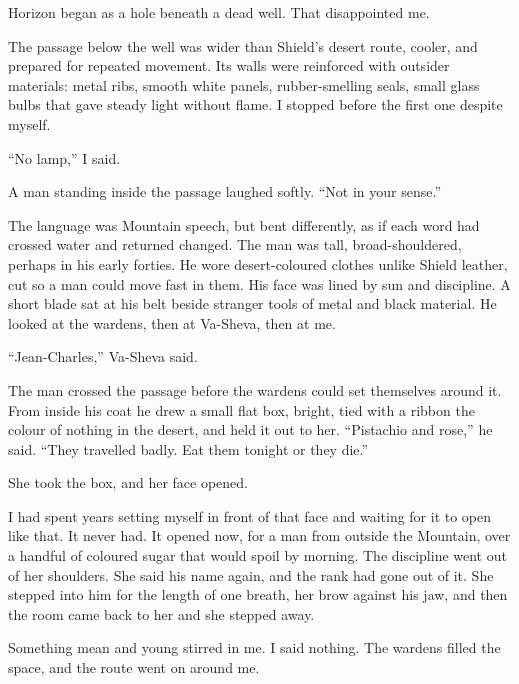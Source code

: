 Horizon began as a hole beneath a dead well. That disappointed me.\par

The passage below the well was wider than Shield's desert route, cooler, and prepared for repeated movement. Its walls were reinforced with outsider materials: metal ribs, smooth white panels, rubber-smelling seals, small glass bulbs that gave steady light without flame. I stopped before the first one despite myself.\par

``No lamp,'' I said.\par

A man standing inside the passage laughed softly. ``Not in your sense.''\par

The language was Mountain speech, but bent differently, as if each word had crossed water and returned changed. The man was tall, broad-shouldered, perhaps in his early forties. He wore desert-coloured clothes unlike Shield leather, cut so a man could move fast in them. His face was lined by sun and discipline. A short blade sat at his belt beside stranger tools of metal and black material. He looked at the wardens, then at Va-Sheva, then at me.\par

``Jean-Charles,'' Va-Sheva said.\par

The man crossed the passage before the wardens could set themselves around it. From inside his coat he drew a small flat box, bright, tied with a ribbon the colour of nothing in the desert, and held it out to her. ``Pistachio and rose,'' he said. ``They travelled badly. Eat them tonight or they die.''\par

She took the box, and her face opened.\par

I had spent years setting myself in front of that face and waiting for it to open like that. It never had. It opened now, for a man from outside the Mountain, over a handful of coloured sugar that would spoil by morning. The discipline went out of her shoulders. She said his name again, and the rank had gone out of it. She stepped into him for the length of one breath, her brow against his jaw, and then the room came back to her and she stepped away.\par

Something mean and young stirred in me. I said nothing. The wardens filled the space, and the route went on around me.\par

